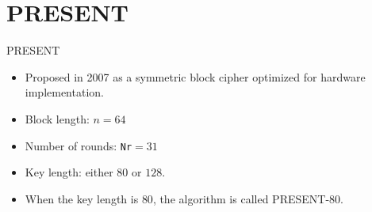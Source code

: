 \section{PRESENT}
\begin{frame}{\VideoName}
    \tableofcontents[currentsection]
\end{frame}

\begin{frame}{PRESENT}
    \begin{itemize}
        \item Proposed in 2007 as a symmetric block cipher optimized for hardware implementation.
       \item Block length: $n=64$
       \item Number of rounds: \texttt{Nr}$=31$
       \item Key length: either $80$ or $128$.
        \item When the key length is $80$, the algorithm is called PRESENT-80.
    \end{itemize}
\end{frame}

